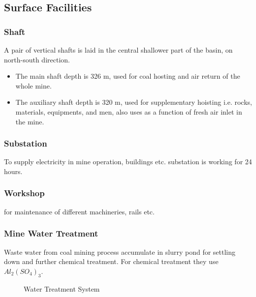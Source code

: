 \documentclass[12pt,a4paper]{article}
\begin{document}
\subsection{Surface Facilities}

\subsubsection{Shaft}
A pair of vertical shafts is laid in the central shallower part of the basin, on north-south direction.
\begin{itemize}
\item The main shaft depth is 326 m, used for coal hosting and air return of the whole mine.
\item The auxiliary shaft depth is 320 m, used for supplementary hoisting i.e. rocks, materials, equipments, and men, also uses as a function of fresh air inlet in the mine.
\end{itemize} 
\subsubsection{Substation}
To supply electricity in mine operation, buildings etc. substation is working for 24 hours.
\subsubsection{Workshop}
for maintenance of different machineries, rails etc.
\subsubsection{Mine Water Treatment}
Waste water from coal mining process accumulate in slurry pond for settling down and further chemical treatment. For chemical treatment they use $Al_2(SO_4)_3$.

\begin{figure}[ht]
\centering
{}
\caption{Water Treatment System}
\label{watertreatment}
\end{figure}
\clearpage
\end{document}
